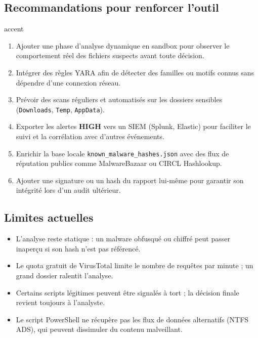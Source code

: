 \documentclass[12pt,a4paper]{article}
\begin{document}
\subsection{Recommandations pour renforcer l'outil}

\begin{riskbox}{accent}
  \color{white}
  \begin{enumerate}[itemsep=6pt]
    \item Ajouter une phase d'analyse dynamique en sandbox pour observer le comportement réel des fichiers suspects avant toute décision.
    \item Intégrer des règles YARA afin de détecter des familles ou motifs connus sans dépendre d'une connexion réseau.
    \item Prévoir des scans réguliers et automatisés sur les dossiers sensibles (\texttt{Downloads}, \texttt{Temp}, \texttt{AppData}).
    \item Exporter les alertes \textbf{HIGH} vers un SIEM (Splunk, Elastic) pour faciliter le suivi et la corrélation avec d'autres événements.
    \item Enrichir la base locale \texttt{known\_malware\_hashes.json} avec des flux de réputation publics comme MalwareBazaar ou CIRCL Hashlookup.
    \item Ajouter une signature ou un hash du rapport lui-même pour garantir son intégrité lors d'un audit ultérieur.
  \end{enumerate}
\end{riskbox}

\subsection{Limites actuelles}

\begin{itemize}[itemsep=4pt]
  \item L'analyse reste statique : un malware obfusqué ou chiffré peut passer inaperçu si son hash n'est pas référencé.
  \item Le quota gratuit de VirusTotal limite le nombre de requêtes par minute ; un grand dossier ralentit l'analyse.
  \item Certains scripts légitimes peuvent être signalés à tort ; la décision finale revient toujours à l'analyste.
  \item Le script PowerShell ne récupère pas les flux de données alternatifs (NTFS ADS), qui peuvent dissimuler du contenu malveillant.
\end{itemize}
\end{document}

